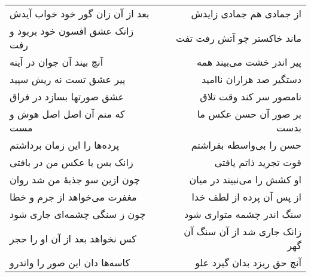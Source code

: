 \begin{center}
\begin{longtable}{l p{0.5cm} r}
\\
بعد از آن زان گور خود خواب آیدش
&&
از جمادی هم جمادی زایدش
\\
زانک عشق افسون خود بربود و رفت
&&
ماند خاکستر چو آتش رفت تفت
\\
آنچ بیند آن جوان در آینه
&&
پیر اندر خشت می‌بیند همه
\\
پیر عشق تست نه ریش سپید
&&
دستگیر صد هزاران ناامید
\\
عشق صورتها بسازد در فراق
&&
نامصور سر کند وقت تلاق
\\
که منم آن اصل اصل هوش و مست
&&
بر صور آن حسن عکس ما بدست
\\
پرده‌ها را این زمان برداشتم
&&
حسن را بی‌واسطه بفراشتم
\\
زانک بس با عکس من در بافتی
&&
قوت تجرید ذاتم یافتی
\\
چون ازین سو جذبهٔ من شد روان
&&
او کشش را می‌نبیند در میان
\\
مغفرت می‌خواهد از جرم و خطا
&&
از پس آن پرده از لطف خدا
\\
چون ز سنگی چشمه‌ای جاری شود
&&
سنگ اندر چشمه متواری شود
\\
کس نخواهد بعد از آن او را حجر
&&
زانک جاری شد از آن سنگ آن گهر
\\
کاسه‌ها دان این صور را واندرو
&&
آنچ حق ریزد بدان گیرد علو
\\
\end{longtable}
\end{center}

